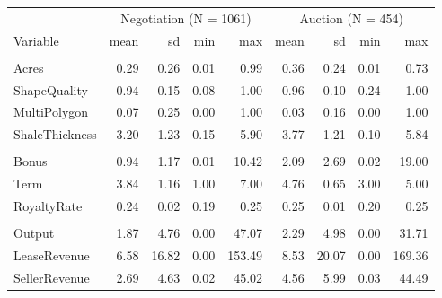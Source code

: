 
\begin{tabular}{lrrrrrrrr}
\toprule
\multicolumn{1}{c}{ } & \multicolumn{4}{c}{Negotiation (N = 1061)} & \multicolumn{4}{c}{Auction (N = 454)} \\
\cmidrule(l{3pt}r{3pt}){2-5} \cmidrule(l{3pt}r{3pt}){6-9}
Variable & mean & sd & min & max & mean & sd & min & max\\
\midrule
\addlinespace[0.3em]
\multicolumn{9}{l}{\textbf{Land Characteristics}}\\
\hspace{1em}Acres & 0.29 & 0.26 & 0.01 & 0.99 & 0.36 & 0.24 & 0.01 & 0.73\\
\hspace{1em}ShapeQuality & 0.94 & 0.15 & 0.08 & 1.00 & 0.96 & 0.10 & 0.24 & 1.00\\
\hspace{1em}MultiPolygon & 0.07 & 0.25 & 0.00 & 1.00 & 0.03 & 0.16 & 0.00 & 1.00\\
\hspace{1em}ShaleThickness & 3.20 & 1.23 & 0.15 & 5.90 & 3.77 & 1.21 & 0.10 & 5.84\\
\addlinespace[0.3em]
\multicolumn{9}{l}{\textbf{Lease Characteristics}}\\
\hspace{1em}Bonus & 0.94 & 1.17 & 0.01 & 10.42 & 2.09 & 2.69 & 0.02 & 19.00\\
\hspace{1em}Term & 3.84 & 1.16 & 1.00 & 7.00 & 4.76 & 0.65 & 3.00 & 5.00\\
\hspace{1em}RoyaltyRate & 0.24 & 0.02 & 0.19 & 0.25 & 0.25 & 0.01 & 0.20 & 0.25\\
\addlinespace[0.3em]
\multicolumn{9}{l}{\textbf{Lease Outcomes}}\\
\hspace{1em}Output & 1.87 & 4.76 & 0.00 & 47.07 & 2.29 & 4.98 & 0.00 & 31.71\\
\hspace{1em}LeaseRevenue & 6.58 & 16.82 & 0.00 & 153.49 & 8.53 & 20.07 & 0.00 & 169.36\\
\hspace{1em}SellerRevenue & 2.69 & 4.63 & 0.02 & 45.02 & 4.56 & 5.99 & 0.03 & 44.49\\
\bottomrule
\end{tabular}
